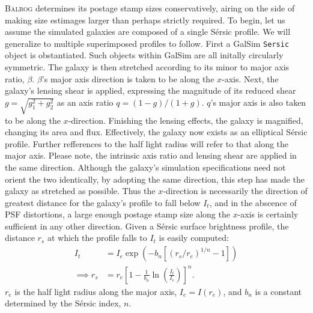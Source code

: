 \documentclass[12pt]{book}
\newcommand{\galsim}{GalSim}
\newcommand{\balrog}{\textsc{Balrog}}
\newcommand{\sersic}{S\'{e}rsic}
\begin{document}
\balrog{} determines its postage stamp sizes conservatively,
airing on the side of making size estimages larger than perhaps strictly required.
To begin, let us assume the simulated galaxies are composed of a single \sersic{} profile.
We will generalize to multiple superimposed profiles to follow.
First a \galsim{} \texttt{Sersic} object is obstantiated.
Such objects within \galsim{} are all initally circularly symmetric. 
The galaxy is then stretched according to its minor to major axis ratio, $\beta$.
$\beta$'s major axis direction is taken to be along the $x$-axis.
Next, the galaxy's lensing shear is applied, expressing the magnitude of its reduced shear 
\mbox{$g = \sqrt{ g_1^2 + g_2^2}$}
as an axis ratio
\mbox{$q = (1-g)/(1+g)$}.
$q$'s major axis is also taken to be along the $x$-direction.
Finishing the lensing effects, the galaxy is magnified, changing its area and flux.
Effectively, the galaxy now exists as an elliptical \sersic{} profile.
Further refferences to the half light radius will refer to that along the major axis.
Please note, the intrinsic axis ratio and lensing shear are applied in the same direction. 
Although the galaxy's simulation specifications need not orient the two identically,
by adopting the same direction, this step has made the galaxy as stretched as possible.
Thus the $x$-direction is necessarily the direction of greatest distance for the galaxy's profile to fall below $I_t$,
and in the abscence of PSF distortions, a large enough postage stamp size along the $x$-axis is certainly 
sufficient in any other direction. Given a \sersic{} surface brightness profile, the distance $r_s$ at which the profile
falls to $I_t$ is easily computed:
\begin{align}
I_t &= I_e \exp \left( -b_n \left[\left( r_s/r_e  \right)^{1/n} -1 \right] \right) \label{eq:sersic} \\
\implies r_s &= r_e \left[1 - \frac{1}{b_n}  \ln \left(\frac{I_t}{ I_e}\right) \right]^n. \label{eq:rt}
\end{align}
$r_e$ is the half light radius along the major axis, 
$I_e = I\left(r_e\right)$,
and $b_n$ is a constant determined by the \sersic{} index, $n$.
\end{document}
